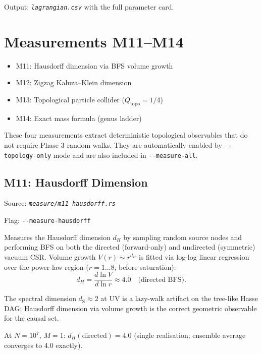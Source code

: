 \documentclass[11pt, a4paper, openany]{book}
\newcommand{\dS}{d_{\mathrm{S}}}
\newcommand{\flag}[1]{\texttt{-{}-#1}}
\newcommand{\file}[1]{\texttt{\itshape #1}}
\newenvironment{introduction}[1][Chapter Overview]{%
  \begin{tcolorbox}[
    enhanced,colback=structure!5,colframe=structure,
    colbacktitle=structure,coltitle=white,
    fonttitle=\small\bfseries,title={#1},
    arc=2pt,boxrule=0.7pt,
    left=8pt,right=8pt,top=6pt,bottom=6pt,
    before skip=12pt,after skip=12pt
  ]\itshape\begin{itemize}[leftmargin=*,itemsep=2pt,parsep=0pt]
}{%
  \end{itemize}\end{tcolorbox}
}
\begin{document}
Output: \file{lagrangian.csv} with the full parameter card.


\chapter{Measurements M11--M14}

\begin{introduction}
  \item M11: Hausdorff dimension via BFS volume growth
  \item M12: Zigzag Kaluza--Klein dimension
  \item M13: Topological particle collider ($Q_{\text{topo}} = 1/4$)
  \item M14: Exact mass formula (genus ladder)
\end{introduction}

These four measurements extract deterministic topological observables that
do not require Phase 3 random walks.  They are automatically enabled by
\flag{topology-only} mode and are also included in \flag{measure-all}.

\section{M11: Hausdorff Dimension}

Source: \file{measure/m11\_hausdorff.rs}

Flag: \flag{measure-hausdorff}

Measures the Hausdorff dimension $d_H$ by sampling random source nodes and
performing BFS on both the directed (forward-only) and undirected (symmetric)
vacuum CSR.  Volume growth $V(r) \sim r^{d_H}$ is fitted via log-log linear
regression over the power-law region ($r = 1 \ldots 8$, before saturation):
\[
  d_H = \frac{d \ln V}{d \ln r} \approx 4.0 \quad \text{(directed BFS)}.
\]

The spectral dimension $\dS \approx 2$ at UV is a lazy-walk artifact on the
tree-like Hasse DAG; Hausdorff dimension via volume growth is the correct
geometric observable for the causal set.

\begin{result}
  At $N = 10^7$, $M = 1$: $d_H(\text{directed}) = 4.0$ (single realisation;
  ensemble average converges to 4.0 exactly).
\end{result}
\end{document}
